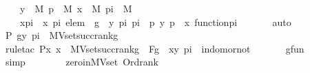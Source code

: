 \begin{isabellebody}
\ \ \ \ {\isachardoublequoteopen}y\ {\isasymin}\ M{\isachardoublequoteclose}\ {\isachardoublequoteopen}p\ {\isasymin}\ M{\isachardoublequoteclose}\ {\isachardoublequoteopen}x\ {\isasymin}\ M{\isachardoublequoteclose}\ {\isachardoublequoteopen}pi\ {\isasymin}\ M{\isachardoublequoteclose}\ \isanewline
\ \ \ \ {\isachardoublequoteopen}x{\isacharunderscore}{\kern0pt}pi\ {\isacharequal}{\kern0pt}\ {\isacharless}{\kern0pt}x{\isacharcomma}{\kern0pt}\ pi{\isachargreater}{\kern0pt}{\isachardoublequoteclose}\ {\isachardoublequoteopen}elem\ {\isacharequal}{\kern0pt}\ {\isasymlangle}g\ {\isacharbackquote}{\kern0pt}\ {\isasymlangle}y{\isacharcomma}{\kern0pt}\ pi{\isasymrangle}{\isacharcomma}{\kern0pt}\ pi\ {\isacharbackquote}{\kern0pt}\ p{\isasymrangle}{\isachardoublequoteclose}\ {\isachardoublequoteopen}{\isasymlangle}y{\isacharcomma}{\kern0pt}\ p{\isasymrangle}\ {\isasymin}\ x{\isachardoublequoteclose}\ {\isachardoublequoteopen}function{\isacharparenleft}{\kern0pt}pi{\isacharparenright}{\kern0pt}{\isachardoublequoteclose}\isanewline
\ \ \ \ \ \isamarkupfalse%
\ auto\ \isanewline
\isanewline
\ \ \ \isamarkupfalse%
\ P{}{\isacharcolon}{\kern0pt}\ {\isachardoublequoteopen}g{\isacharbackquote}{\kern0pt}{\isacharless}{\kern0pt}y{\isacharcomma}{\kern0pt}\ pi{\isachargreater}{\kern0pt}\ {\isasymin}\ MVset{\isacharparenleft}{\kern0pt}succ{\isacharparenleft}{\kern0pt}rank{\isacharparenleft}{\kern0pt}g{\isacharparenright}{\kern0pt}{\isacharparenright}{\kern0pt}{\isacharparenright}{\kern0pt}{\isachardoublequoteclose}\ \isanewline
\ \ \ \ \ \isamarkupfalse%
\ {\isacharparenleft}{\kern0pt}rule{\isacharunderscore}{\kern0pt}tac\ P{\isacharequal}{\kern0pt}{\isachardoublequoteopen}{\isasymlambda}x{\isachardot}{\kern0pt}\ x\ {\isasymin}\ MVset{\isacharparenleft}{\kern0pt}succ{\isacharparenleft}{\kern0pt}rank{\isacharparenleft}{\kern0pt}g{\isacharparenright}{\kern0pt}{\isacharparenright}{\kern0pt}{\isacharparenright}{\kern0pt}{\isachardoublequoteclose}\ \ F{\isacharequal}{\kern0pt}g\ \ x{\isacharequal}{\kern0pt}{\isachardoublequoteopen}{\isacharless}{\kern0pt}y{\isacharcomma}{\kern0pt}\ pi{\isachargreater}{\kern0pt}{\isachardoublequoteclose}\ \ in{\isacharunderscore}{\kern0pt}dom{\isacharunderscore}{\kern0pt}or{\isacharunderscore}{\kern0pt}not{\isacharparenright}{\kern0pt}\isanewline
\ \ \ \ \ \isamarkupfalse%
\ gfun\ \isanewline
\ \ \ \ \ \ \ \isamarkupfalse%
\ simp\ \isanewline
\ \ \ \ \ \isamarkupfalse%
\ zero{\isacharunderscore}{\kern0pt}in{\isacharunderscore}{\kern0pt}MVset\ Ord{\isacharunderscore}{\kern0pt}rank\ \isanewline

\end{isabellebody}
